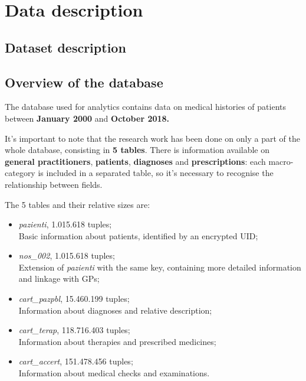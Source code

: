 \chapter{Data description}

\section{Dataset description}

\section{Overview of the database}
The database used for analytics contains data on medical histories of patients between \textbf{January 2000} and \textbf{October 2018.} 

It's important to note that the research work has been done on only a part of the whole database, consisting in \textbf{5 tables}. There is information available on \textbf{general practitioners}, \textbf{patients}, \textbf{diagnoses} and \textbf{prescriptions}: each macro-category is included in a separated table, so it's necessary to recognise the relationship between fields.

The 5 tables and their relative sizes are:
\begin{itemize}
	\item \textit{pazienti}, 1.015.618 tuples; \\
	Basic information about patients, identified by an encrypted UID;
	\item \textit{nos\_002}, 1.015.618 tuples; \\
	Extension of \textit{pazienti} with the same key, containing more detailed information and linkage with GPs;
	\item \textit{cart\_pazpbl}, 15.460.199 tuples; \\
	Information about diagnoses and relative description;
	\item \textit{cart\_terap}, 118.716.403 tuples; \\
	Information about therapies and prescribed medicines;
	\item \textit{cart\_accert}, 151.478.456 tuples; \\
	Information about medical checks and examinations.
\end{itemize}

